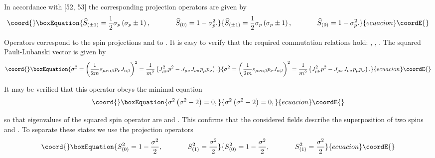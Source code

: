 \documentclass[a4paper,12pt]{article}
\begin{document}
In accordance with [52, 53] the corresponding projection operators
are given by
\begin{equation}\coord{}\boxEquation{
\widehat{S}_{(\pm 1)}=\frac 12\sigma _p\left( \sigma _p\pm
1\right) ,\hspace{0.5in}\widehat{S}_{(0)}=1-\sigma _p^2
.\label{28}
}{
\widehat{S}_{(\pm 1)}=\frac 12\sigma _p\left( \sigma _p\pm
1\right) ,\hspace{0.5in}\widehat{S}_{(0)}=1-\sigma _p^2
.}{ecuacion}\coordE{}\end{equation}

Operators \coordHE{} correspond to the spin
projections \coordHE{} and \coordHE{} to \coordHE{}. It is
easy to verify that the required commutation relations hold:
\coordHE{}, \coordHE{},
\coordHE{}. The squared
Pauli-Lubanski vector \coordHE{} is given by
\begin{equation}\coord{}\boxEquation{
\sigma ^2=\left( \frac 1{2m}\varepsilon _{\mu \nu \alpha \beta
}p_\nu J_{\alpha \beta }\right) ^2=\frac 1{m^2}\left( J_{\mu \nu
}^2p^2-J_{\mu \sigma }J_{\nu \sigma }p_\mu p_\nu \right) .
\label{29}
}{
\sigma ^2=\left( \frac 1{2m}\varepsilon _{\mu \nu \alpha \beta
}p_\nu J_{\alpha \beta }\right) ^2=\frac 1{m^2}\left( J_{\mu \nu
}^2p^2-J_{\mu \sigma }J_{\nu \sigma }p_\mu p_\nu \right) .
}{ecuacion}\coordE{}\end{equation}

It may be verified that this operator obeys the minimal equation
\begin{equation}\coord{}\boxEquation{
\sigma ^2\left( \sigma ^2-2\right) =0 , \label{30}
}{
\sigma ^2\left( \sigma ^2-2\right) =0 , }{ecuacion}\coordE{}\end{equation}

so that eigenvalues of the squared spin operator \coordHE{} are \coordHE{}
and \coordHE{}. This confirms that the considered fields describe the
superposition of two spins \coordHE{} and \coordHE{}. To separate these states we use
the projection operators
\begin{equation}\coord{}\boxEquation{
S_{(0)}^2=1-\frac{\sigma ^2}2
,\hspace{0.5in}S_{(1)}^2=\frac{\sigma ^2}2 \label{31}
}{
S_{(0)}^2=1-\frac{\sigma ^2}2
,\hspace{0.5in}S_{(1)}^2=\frac{\sigma ^2}2 }{ecuacion}\coordE{}\end{equation}
\end{document}
